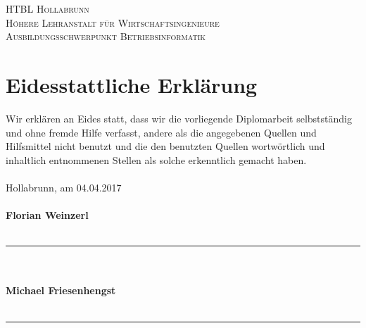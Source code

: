{
	\centering
	{\scshape\Large {HTBL Hollabrunn}\\}
	{\scshape\large {Höhere Lehranstalt für Wirtschaftsingenieure}\\}
	{\scshape\normalsize Ausbildungsschwerpunkt Betriebsinformatik\\}
}
\vspace{1.5cm}
\section*{Eidesstattliche Erklärung}
\vspace{0.5cm}
Wir erklären an Eides statt, dass wir die vorliegende Diplomarbeit selbstständig und ohne fremde Hilfe verfasst, andere als die angegebenen Quellen und Hilfsmittel nicht benutzt und die den benutzten Quellen wortwörtlich und inhaltlich entnommenen Stellen als solche erkenntlich gemacht haben.\\
\\
Hollabrunn, am 04.04.2017\\
\vspace{1cm}\\
\textbf{Florian Weinzerl}\\
\\
\rule{8cm}{0.15mm}\\
\\
\textbf{Michael Friesenhengst}\\
\\
\rule{8cm}{0.15mm}